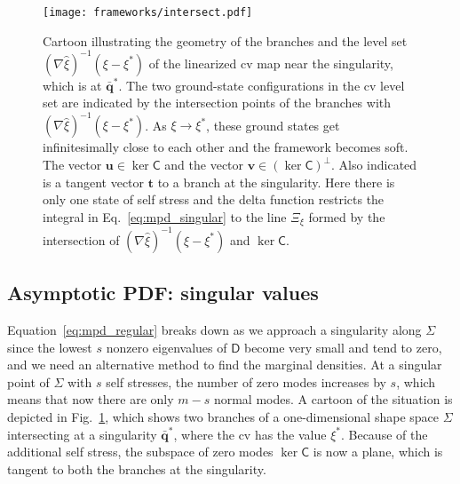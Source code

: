 \begin{figure}
  \begin{center}
    \texttt{[image: frameworks/intersect.pdf]}
  \end{center}
  \caption{Cartoon illustrating the geometry of the branches and the level set $(\nabla\hat{\xi})^{-1}(\xi - \xi^{*})$ of the linearized \ac{cv} map near the singularity, which is at $\bar{\bm{q}}^{*}$.
    The two ground-state configurations in the \ac{cv} level set are indicated by the intersection points of the branches with $(\nabla\hat{\xi})^{-1}(\xi - \xi^{*})$.  As $\xi \to \xi^{*}$, these ground states get infinitesimally close to each other and the framework becomes soft.
    The vector $\bm{u} \in \ker\mathsf{C}$ and the vector $\bm{v} \in (\ker\mathsf{C})^{\perp}$.
    Also indicated is a tangent vector $\bm{t}$ to a branch at the singularity.
    Here there is only one state of self stress and the delta function restricts the integral in Eq.~\eqref{eq:mpd_singular} to the line $\Xi_{\xi}$ formed by the intersection of $(\nabla\hat{\xi})^{-1}(\xi - \xi^{*})$ and $\ker\mathsf{C}$.
  }
  \label{fig:intersect}
\end{figure}

\subsection{Asymptotic PDF: singular values}
\label{sec:singular}

Equation~\eqref{eq:mpd_regular} breaks down as we approach a singularity along $\Sigma$ since the lowest $s$ nonzero eigenvalues of $\mathsf{D}$ become very small and tend to zero, and we need an alternative method to find the marginal densities.
At a singular point of $\Sigma$ with $s$ self stresses, the number of zero modes increases by $s$, which means that now there are only $m-s$ normal modes.
A cartoon of the situation is depicted in Fig.~\ref{fig:intersect}, which shows two branches of a one-dimensional shape space $\Sigma$ intersecting at a singularity $\bar{\bm{q}}^{*}$, where the \ac{cv} has the value $\xi^{*}$.
Because of the additional self stress, the subspace of zero modes $\ker\mathsf{C}$ is now a plane, which is tangent to both the branches at the singularity.

